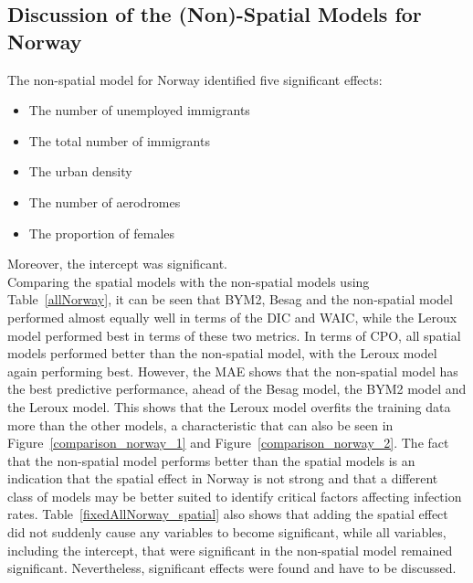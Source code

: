 \subsection{Discussion of the (Non)-Spatial Models for Norway}\label{sec:models_norway}
The non-spatial model for Norway identified five significant effects:
\begin{itemize}
    \item The number of unemployed immigrants 
    \item The total number of immigrants 
    \item The urban density 
    \item The number of aerodromes 
    \item The proportion of females 
\end{itemize}
Moreover, the intercept was significant. \\
Comparing the spatial models with the non-spatial models using Table~\ref{allNorway}, it can be seen that BYM2, Besag and the non-spatial model performed almost equally well in terms of the DIC and WAIC, while the Leroux model performed best in terms of these two metrics. In terms of CPO, all spatial models performed better than the non-spatial model, with the Leroux model again performing best. However, the MAE shows that the non-spatial model has the best predictive performance, ahead of the Besag model, the BYM2 model and the Leroux model. This shows that the Leroux model overfits the training data more than the other models, a characteristic that can also be seen in Figure~\ref{comparison_norway_1} and Figure~\ref{comparison_norway_2}. The fact that the non-spatial model performs better than the spatial models is an indication that the spatial effect in Norway is not strong and that a different class of models may be better suited to identify critical factors affecting infection rates. Table~\ref{fixedAllNorway_spatial} also shows that adding the spatial effect did not suddenly cause any variables to become significant, while all variables, including the intercept, that were significant in the non-spatial model remained significant. Nevertheless, significant effects were found and have to be discussed. \\
